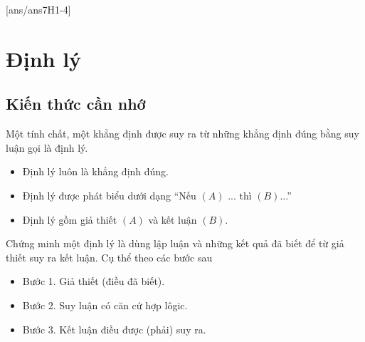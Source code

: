 [ans/ans7H1-4]
\section{Định lý}
\subsection{Kiến thức cần nhớ}
\begin{dn}
Một tính chất, một khẳng định được suy ra từ những khẳng định đúng  bằng suy luận gọi là định lý.
\end{dn}
\begin{note}
	\begin{itemize}
		\item Định lý luôn là khẳng định đúng.
		\item Định lý được phát biểu dưới dạng ``Nếu $(A)$ ... thì $(B)$...''
		\item Định lý gồm giả thiết $(A)$ và kết luận $(B)$.
	\end{itemize}
\end{note}
\begin{note} Chứng minh một định lý là dùng lập luận và những kết quả đã biết để từ giả thiết suy ra kết luận. Cụ thể theo các bước sau
	\begin{itemize}
		\item  Bước 1. Giả thiết (điều đã biết).
		\item  Bước 2. Suy luận có căn cứ hợp lôgic.
		\item  Bước 3. Kết luận điều được (phải) suy ra.
	\end{itemize}
\end{note}

